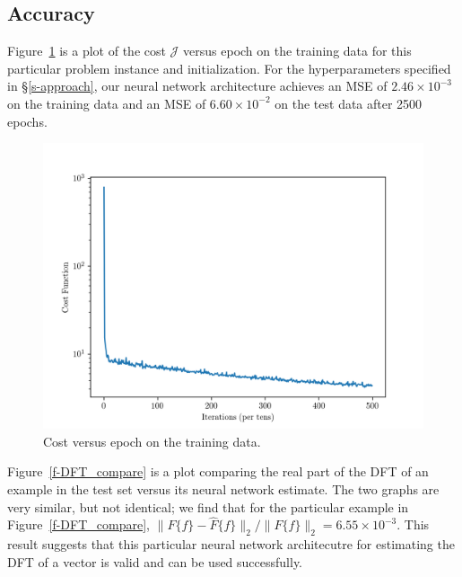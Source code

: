 \documentclass[12pt]{article}
\begin{document}
\subsection{Accuracy} 
Figure~\ref{f-example_cost_vs_epoch} is a plot of the cost $\mathcal J$ versus epoch on the training 
data for this particular problem instance and initialization. 
For the hyperparameters specified in \S\ref{s-approach}, our neural network architecture achieves an 
MSE of $2.46 \times 10^{-3}$ on the training data and an MSE of $6.60 \times 10^{-2}$ on the test data after 
2500 epochs.

\begin{figure}
\centering
\includegraphics[scale=.5]{figures/final_cost_vs_epoch.png}
\caption{Cost versus epoch on the training data.}
\label{f-example_cost_vs_epoch}
\end{figure}

Figure~\ref{f-DFT_compare} is a plot comparing the real part of the DFT of an example in the test set 
versus its neural network estimate. The two graphs are very similar, but not identical; we 
find that for the particular example in Figure~\ref{f-DFT_compare}, 
$\|F\{f\} - \hat{F}\{f\}\|_2 / \|F\{f\}\|_2 = 6.55 \times 10^{-3}$. This result suggests that this particular
neural network architecutre for estimating the DFT of a vector is valid and can be used successfully.
\end{document}
